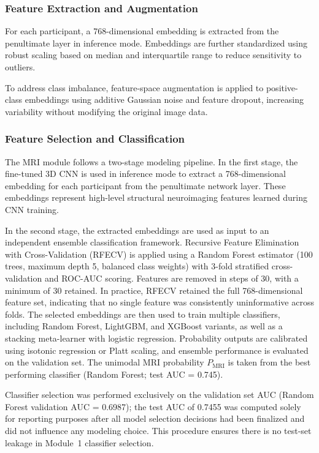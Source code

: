 \documentclass[10pt,letterpaper]{article}
\newcommand{\hlpar}[1]{\leavevmode\colorbox{yellow!30}{\parbox{\dimexpr\linewidth-2\fboxsep\relax}{#1}}\vspace{2pt}}
\begin{document}
                                                                        \subsubsection*{\textbf{Feature Extraction and Augmentation}}

                                                                        For each participant, a 768-dimensional embedding is extracted from the penultimate layer in inference mode. Embeddings are further standardized using robust scaling based on median and interquartile range to reduce sensitivity to outliers.

                                                                        To address class imbalance, feature-space augmentation is applied to positive-class embeddings using additive Gaussian noise and feature dropout, increasing variability without modifying the original image data.

                                                                        \subsubsection*{\textbf{Feature Selection and Classification}}

                                                                        The MRI module follows a two-stage modeling pipeline. In the first stage, the fine-tuned 3D CNN is used in inference mode to extract a 768-dimensional embedding for each participant from the penultimate network layer. These embeddings represent high-level structural neuroimaging features learned during CNN training.

                                                                         In the second stage, the extracted embeddings are used as input to an independent ensemble classification framework. Recursive Feature Elimination with Cross-Validation (RFECV) is applied using a Random Forest estimator (100 trees, maximum depth 5, balanced class weights) with 3-fold stratified cross-validation and ROC-AUC scoring. Features are removed in steps of 30, with a minimum of 30 retained. In practice, RFECV retained the full 768-dimensional feature set, indicating that no single feature was consistently uninformative across folds. The selected embeddings are then used to train multiple classifiers, including Random Forest, LightGBM, and XGBoost variants, as well as a stacking meta-learner with logistic regression. Probability outputs are calibrated using isotonic regression or Platt scaling, and ensemble performance is evaluated on the validation set. The unimodal MRI probability $P_{\text{MRI}}$ is taken from the best performing classifier (Random Forest; test AUC = 0.745).
\hlpar{Classifier selection was performed exclusively on the validation set AUC (Random Forest validation AUC = 0.6987); the test AUC of 0.7455 was computed solely for reporting purposes after all model selection decisions had been finalized and did not influence any modeling choice. This procedure ensures there is no test-set leakage in Module~1 classifier selection.}
\end{document}
